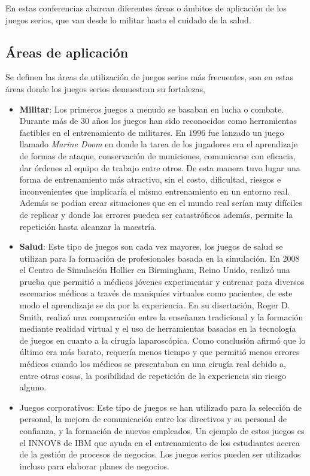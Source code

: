 En estas conferencias abarcan diferentes áreas o ámbitos de aplicación de los
juegos serios, que van desde lo militar hasta el cuidado de la salud.

\subsection{Áreas de aplicación}
\label{sec:areas_aplicacion}

Se definen las áreas de utilización de juegos serios más frecuentes, son en 
estas áreas donde los juegos serios demuestran su fortalezas,

\begin{itemize}

\item \textbf{Militar}: Los primeros juegos a menudo se basaban en lucha o
    combate. Durante más de 30 años los juegos han sido reconocidos como
    herramientas factibles en el entrenamiento de militares. En $1996$ fue
    lanzado un juego llamado \emph{Marine Doom} en donde la tarea de los
    jugadores era el aprendizaje de formas de ataque, conservación de
    municiones, comunicarse con eficacia, dar órdenes al equipo de trabajo entre
    otros. De esta manera tuvo lugar una forma de entrenamiento más atractivo,
    sin el costo, dificultad, riesgos e inconvenientes que implicaría el mismo
    entrenamiento en un entorno real. Además se podían crear situaciones que en
    el mundo real serían muy difíciles de replicar y donde los errores pueden
    ser catastróficos además, permite la repetición hasta alcanzar la
    maestría\cite{education:games}.

\item \textbf{Salud}: Este tipo de juegos son cada vez mayores, los juegos de
    salud se utilizan para la formación de profesionales basada en la
    simulación. En 2008 el Centro de Simulación Hollier en Birmingham, Reino
    Unido, realizó una prueba que permitió a médicos jóvenes experimentar y
    entrenar para diversos escenarios médicos a través de maniquíes virtuales
    como pacientes, de este modo el aprendizaje se da por la experiencia. En su
    disertación, Roger D. Smith, realizó una comparación entre la enseñanza
    tradicional y la formación mediante realidad virtual y el uso de
    herramientas basadas en la tecnología de juegos en cuanto a la cirugía
    laparoscópica. Como conclusión afirmó que lo último era más barato, requería
    menos tiempo y que permitió menos errores médicos cuando los médicos se
    presentaban en una cirugía real debido a, entre otras cosas, la posibilidad
    de repetición de la experiencia sin riesgo alguno\cite{education:games}. 

\item Juegos corporativos: Este tipo de juegos se han utilizado para la
    selección de personal, la mejora de comunicación entre los directivos y su
    personal de confianza, y la formación de nuevos empleados. Un ejemplo de
    estos juegos es el INNOV8 de IBM que ayuda en el entrenamiento de los
    estudiantes acerca de la gestión de procesos de negocios. Los juegos serios
    pueden ser utilizados incluso para elaborar planes de
    negocios\cite{education:games}. 

\end{itemize}
